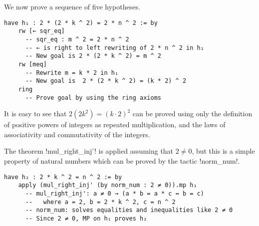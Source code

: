 
\begin{center}
\setlength{\fboxrule}{1pt}
\end{center}

We now prove a sequence of five hypotheses.
\begin{Verbatim}[firstnumber=last]
  have h₁ : 2 * (2 * k ^ 2) = 2 * n ^ 2 := by
    rw [← sqr_eq]
      -- sqr_eq : m ^ 2 = 2 * n ^ 2
      -- ← is right to left rewriting of 2 * n ^ 2 in h₁
      -- New goal is 2 * (2 * k ^ 2) = m ^ 2
    rw [meq]
      -- Rewrite m = k * 2 in h₁
      -- New goal is  2 * (2 * k ^ 2) = (k * 2) ^ 2
    ring
      -- Prove goal by using the ring axioms
\end{Verbatim}


It is easy to see that $2(2k^2)=(k\cdot 2)^2$ can be proved using only the definition of positive powers of integers as repeated multiplication, and the laws of associativity and commutativity of the integers.

The theorem !mul_right_inj'! is applied assuming that $2\neq 0$, but this is a simple property of natural numbers which can be proved by the tactic !norm_num!.
\begin{Verbatim}[firstnumber=last]
  have h₂ : 2 * k ^ 2 = n ^ 2 := by
    apply (mul_right_inj' (by norm_num : 2 ≠ 0)).mp h₁
      -- mul_right_inj': a ≠ 0 → (a * b = a * c ↔ b = c)
      --   where a = 2, b = 2 * k ^ 2, c = n ^ 2
      -- norm_num: solves equalities and inequalities like 2 ≠ 0
      -- Since 2 ≠ 0, MP on h₁ proves h₂
\end{Verbatim}


